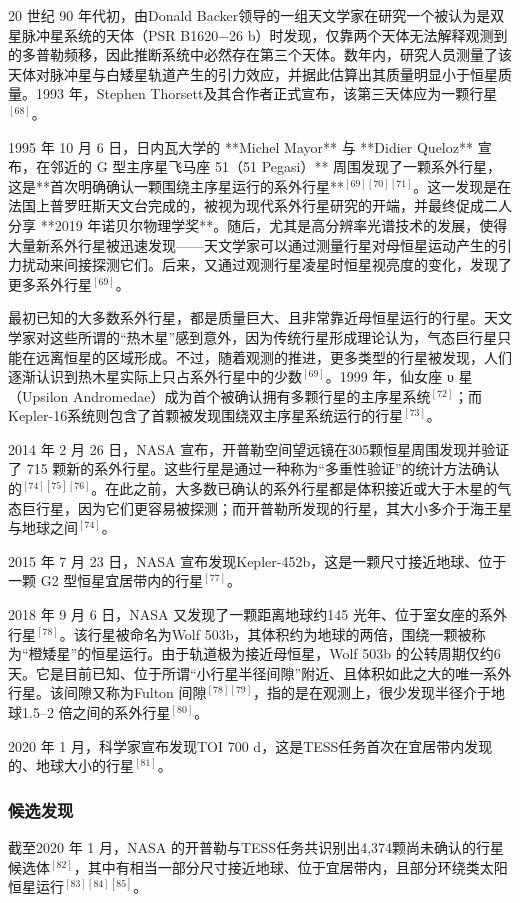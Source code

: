 20 世纪 90 年代初，由Donald Backer领导的一组天文学家在研究一个被认为是双星脉冲星系统的天体（PSR B1620−26 b）时发现，仅靠两个天体无法解释观测到的多普勒频移，因此推断系统中必然存在第三个天体。数年内，研究人员测量了该天体对脉冲星与白矮星轨道产生的引力效应，并据此估算出其质量明显小于恒星质量。1993 年，Stephen Thorsett及其合作者正式宣布，该第三天体应为一颗行星$^{[68]}$。

1995 年 10 月 6 日，日内瓦大学的 **Michel Mayor** 与 **Didier Queloz** 宣布，在邻近的 G 型主序星飞马座 51（51 Pegasi）** 周围发现了一颗系外行星，这是**首次明确确认一颗围绕主序星运行的系外行星**$^{[69][70][71]}$。这一发现是在法国上普罗旺斯天文台完成的，被视为现代系外行星研究的开端，并最终促成二人分享 **2019 年诺贝尔物理学奖**。随后，尤其是高分辨率光谱技术的发展，使得大量新系外行星被迅速发现——天文学家可以通过测量行星对母恒星运动产生的引力扰动来间接探测它们。后来，又通过观测行星凌星时恒星视亮度的变化，发现了更多系外行星$^{[69]}$。

最初已知的大多数系外行星，都是质量巨大、且非常靠近母恒星运行的行星。天文学家对这些所谓的“热木星”感到意外，因为传统行星形成理论认为，气态巨行星只能在远离恒星的区域形成。不过，随着观测的推进，更多类型的行星被发现，人们逐渐认识到热木星实际上只占系外行星中的少数$^{[69]}$。1999 年，仙女座 υ 星（Upsilon Andromedae）成为首个被确认拥有多颗行星的主序星系统$^{[72]}$；而Kepler-16系统则包含了首颗被发现围绕双主序星系统运行的行星$^{[73]}$。

2014 年 2 月 26 日，NASA 宣布，开普勒空间望远镜在305颗恒星周围发现并验证了 715 颗新的系外行星。这些行星是通过一种称为“多重性验证”的统计方法确认的$^{[74][75][76]}$。在此之前，大多数已确认的系外行星都是体积接近或大于木星的气态巨行星，因为它们更容易被探测；而开普勒所发现的行星，其大小多介于海王星与地球之间$^{[74]}$。

2015 年 7 月 23 日，NASA 宣布发现Kepler-452b，这是一颗尺寸接近地球、位于一颗 G2 型恒星宜居带内的行星$^{[77]}$。

2018 年 9 月 6 日，NASA 又发现了一颗距离地球约145 光年、位于室女座的系外行星$^{[78]}$。该行星被命名为Wolf 503b，其体积约为地球的两倍，围绕一颗被称为“橙矮星”的恒星运行。由于轨道极为接近母恒星，Wolf 503b 的公转周期仅约6 天。它是目前已知、位于所谓“小行星半径间隙”附近、且体积如此之大的唯一系外行星。该间隙又称为Fulton 间隙$^{[78][79]}$，指的是在观测上，很少发现半径介于地球1.5–2 倍之间的系外行星$^{[80]}$。

2020 年 1 月，科学家宣布发现TOI 700 d，这是TESS任务首次在宜居带内发现的、地球大小的行星$^{[81]}$。
\subsubsection{候选发现}
截至2020 年 1 月，NASA 的开普勒与TESS任务共识别出4,374颗尚未确认的行星候选体$^{[82]}$，其中有相当一部分尺寸接近地球、位于宜居带内，且部分环绕类太阳恒星运行$^{[83][84][85]}$。
